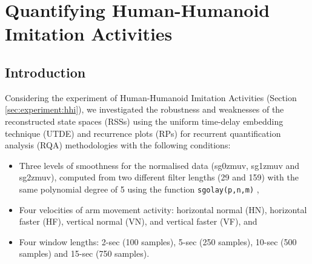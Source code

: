 
\chapter{Quantifying Human-Humanoid Imitation Activities} \label{chapter6}
%
\graphicspath{{figs/chapter6/PDF/}}


\section{Introduction} 
Considering the experiment of Human-Humanoid Imitation Activities
(Section \ref{sec:experiment:hhi}), 
we investigated the robustness and weaknesses of the reconstructed 
state spaces (RSSs) using the uniform time-delay embedding technique (UTDE) 
and recurrence plots (RPs) for recurrent quantification analysis (RQA) 
methodologies with the following conditions: 
\begin{itemize}

\item Three levels of smoothness for the normalised data 
(sg0zmuv, sg1zmuv and sg2zmuv), computed from two different filter 
lengths (29 and 159) with the same polynomial degree of 5 using the 
function \texttt{sgolay(p,n,m)} \citep{Rsignal},

\item Four velocities of arm movement activity: horizontal normal (HN), 
	horizontal faster (HF), vertical normal (VN), and 
	vertical faster (VF), and
\item Four window lengths: 2-sec (100 samples), 5-sec (250 samples), 
	10-sec (500 samples) and 15-sec (750 samples).
\end{itemize}

